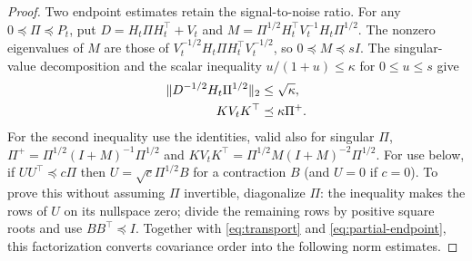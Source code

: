 \begin{proof}
Two endpoint estimates retain the signal-to-noise ratio. For any
$0\preceq\Pi\preceq P_t$, put $D=H_t\Pi H_t^\top+V_t$ and
$M=\Pi^{1/2}H_t^\top V_t^{-1}H_t\Pi^{1/2}$.
The nonzero eigenvalues of $M$ are those of
$V_t^{-1/2}H_t\Pi H_t^\top V_t^{-1/2}$, so $0\preceq M\preceq sI$.
The singular-value decomposition and the scalar inequality
$u/(1+u)\le\kappa$ for $0\le u\le s$ give
\begin{align}
 \lVert D^{-1/2}H_t\Pi^{1/2}\rVert_2&\le\sqrt\kappa,
 \label{eq:partial-endpoint}\\
 K V_tK^\top&\preceq\kappa\Pi^+.
 \label{eq:partial-gain}
\end{align}
For the second inequality use the identities, valid also for singular $\Pi$,
$\Pi^+=\Pi^{1/2}(I+M)^{-1}\Pi^{1/2}$ and
$KV_tK^\top=\Pi^{1/2}M(I+M)^{-2}\Pi^{1/2}$.
For use below, if $UU^\top\preceq c\Pi$ then
$U=\sqrt c\Pi^{1/2}B$ for a contraction $B$ (and $U=0$ if $c=0$).
To prove this without assuming $\Pi$ invertible, diagonalize $\Pi$:
the inequality makes the rows of $U$ on its nullspace zero; divide the
remaining rows by positive square roots and use $BB^\top\preceq I$.
Together with \eqref{eq:transport} and \eqref{eq:partial-endpoint}, this
factorization converts covariance order into the following norm estimates.


\end{proof}
